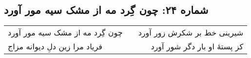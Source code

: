 \begin{center}
\section*{شماره ۲۴: چون گِرد مه از مشک سیه مور آورد}
\label{sec:024}
\begin{longtable}{l p{0.5cm} r}
چون گِرد مه از مشک سیه مور آورد
&&
شیرینی خط بر شکرش زور آورد
\\
فریاد مرا زین دلِ دیوانه مزاج
&&
کز پستهٔ او بار دگر شور آورد
\\
\end{longtable}
\end{center}
